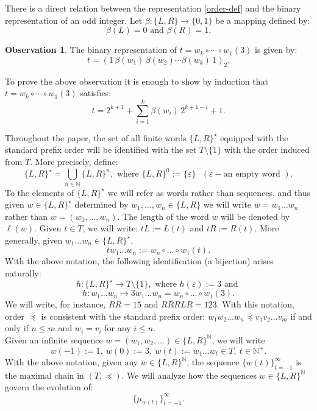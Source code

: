 \documentclass[10pt]{amsart}
\theoremstyle{definition}
\newtheorem{observation}[theorem]{Observation}
\numberwithin{equation}{section}
\newcommand{\eps}{\varepsilon}
\newcommand{\N}{\mathbb{N}}
\begin{document}
 There is a direct relation between the representation \eqref{order-def} and the binary representation of an odd integer. Let $\beta \colon \{L, R\} \to \{0, 1\}$ be a mapping defined by: 
$$\beta(L) = 0\mbox{ and }\beta(R) = 1.$$
\begin{observation}\label{binarr}
 The binary representation of $t=w_k \circ \cdots \circ w_1(3)$ is given by:
$$  t = (1\, \beta(w_1)\, \beta(w_2) \cdots \beta(w_k)\, 1)_2.$$
\end{observation}

To prove the above observation it is enough to show by induction that $t =w_k \circ \cdots \circ w_1(3)$ satisfies:
$$t = 2^{k+1} + \sum_{i=1}^{k} \beta(w_i)\,
2^{k+1-i} + 1.$$

Throughout the paper,  the set of all finite words $\{L,R\}^{\star}$ equipped with the standard prefix order will be identified with the set $T\setminus\{1\}$ with the order induced from  $T$. More precisely, define:
$$\{L,R\}^\star =\bigcup\limits_{n\in\N} \{L,R\}^n,\mbox{ where } \{L,R\}^0:=\{\eps\} \ \ \  (\eps - \mbox{an empty word }).$$
To the elements of $\{L,R\}^\star$ we will refer as words rather than sequences, and thus given $w\in\{L,R\}^\star$ determined by $w_1,\dots,w_n\in \{L,R\}$ we will write $w=w_1 \dots w_n$ rather than $w=(w_1,\dots,w_n)$. The length of the word $w$ will be denoted by $\ell(w)$.  Given $t\in T$, we will write: $tL:=L(t)$ and $tR:=R(t)$. More generally, given $w_1\dots w_n\in\{L,R\}^\star$, 
$$tw_1\dots w_n:=w_n\circ\dots\circ w_1 (t).$$
With the above notation, the following identification (a bijection) arises naturally:
$$h\colon \{L,R\}^\star\longrightarrow T\setminus\{1\},\mbox{ where }h(\varepsilon):=3\mbox{ and }$$
$$h\colon  w_1 \dots w_n\longmapsto 3w_1\dots w_n=w_n\circ\dots\circ w_1 (3).$$
We will write, for instance, $RR=15$ and $RRRLR=123$. With this notation, order $\preceq$ is consistent with the standard prefix order: $w_1w_2\dots 
w_n\preceq v_1v_2\dots v_m$ if and only if $n\leq m$ and $w_i=v_i$ for any $i\leq n$. \\

Given an infinite sequence $w=(w_1,w_2,\dots)\in\{L,R\}^{\N}$, we will write 
\begin{equation}\label{www}
w(-1):=1,\ w(0):=3,\ w(t):=w_1\dots w_t\in T,\ t\in\N^+.
\end{equation}
With the above notation, given any $w\in\{L,R\}^{\N}$, the sequence $\{w(t)\}_{t=-1}^{\infty}$ is the maximal chain in $(T,\preceq)$. We will analyze how
the sequences $w\in\{L,R\}^\N$ govern the evolution of:
$$\{\mu_{w(t)}\}_{t=-1}^{\infty}.$$
\end{document}
